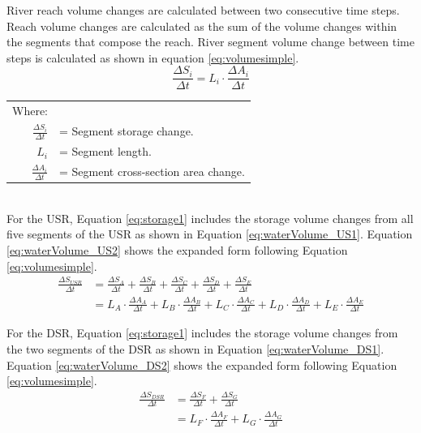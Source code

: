 River reach volume changes are calculated between two consecutive time steps.  Reach volume changes are calculated as the sum of the volume changes within the segments that compose the reach.  River segment volume change between time steps is calculated as shown in equation \ref{eq:volumesimple}.
\begin{equation}
	\frac{\Delta S_i}{\Delta t}=L_i \cdot \frac{\Delta A_i}{\Delta t}
	\label{eq:volumesimple}
\end{equation}
\begin{tabular}{r p{5.5in}}
	Where:&\\
	$\displaystyle \frac{\Delta S_i}{\Delta t}$ & = Segment storage change.\\
	$L_i$ & = Segment length.\\
	$\displaystyle \frac{\Delta A_i}{\Delta t} $ &= Segment cross-section area change.\\
\end{tabular}\\

For the USR, Equation \ref{eq:storage1} includes the storage volume changes from all five segments of the USR as shown in Equation \ref{eq:waterVolume_US1}.  Equation \ref{eq:waterVolume_US2} shows the expanded form following Equation \ref{eq:volumesimple}.
\begin{align}
	\frac{\Delta S_{USR}}{\Delta t} & = \frac{\Delta S_{A}}{\Delta t} + \frac{\Delta S_{B}}{\Delta t} + \frac{\Delta S_{C}}{\Delta t} + \frac{\Delta S_{D}}{\Delta t} + \frac{\Delta S_{E}}{\Delta t} \label{eq:waterVolume_US1} \\
	& = L_A \cdot \frac{\Delta A_{A}}{\Delta t} + L_B \cdot \frac{\Delta A_{B}}{\Delta t} + L_C \cdot \frac{\Delta A_{C}}{\Delta t} + L_D \cdot \frac{\Delta A_{D}}{\Delta t} + L_E \cdot \frac{\Delta A_{E}}{\Delta t} \label{eq:waterVolume_US2}
\end{align}

For the DSR, Equation \ref{eq:storage1} includes the storage volume changes from the two segments of the DSR as shown in Equation \ref{eq:waterVolume_DS1}.  Equation \ref{eq:waterVolume_DS2} shows the expanded form following Equation \ref{eq:volumesimple}.
\begin{align}
	\frac{\Delta S_{DSR}}{\Delta t} & = \frac{\Delta S_{F}}{\Delta t} + \frac{\Delta S_{G}}{\Delta t} \label{eq:waterVolume_DS1} \\
	& = L_F \cdot \frac{\Delta A_{F}}{\Delta t} + L_G \cdot \frac{\Delta A_{G}}{\Delta t} \label{eq:waterVolume_DS2}
\end{align}

